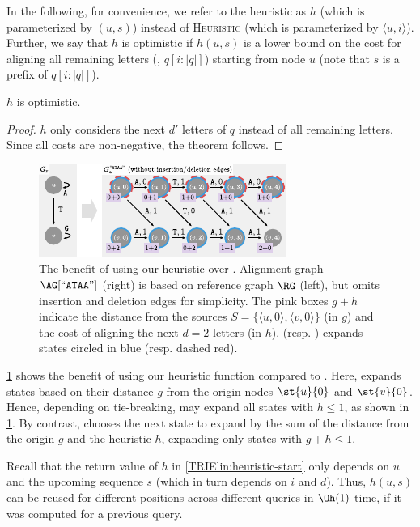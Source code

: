 In the following, for convenience, we refer to the heuristic as $h$ (which is
parameterized by $(u,s)$) instead of \textsc{Heuristic} (which is parameterized
by $\langle u, i \rangle$). Further, we say that $h$ is optimistic if $h(u,s)$
is a lower bound on the cost for aligning all remaining letters (\ie,
$q[i:|q|]$) starting from node $u$ (note that $s$ is a prefix of $q[i:|q|]$).

\begin{samepage}
\begin{thm} \label{TRIEthm:optimistic}
	$h$ is optimistic.
\end{thm}
\begin{proof}
$h$ only considers the next $d'$ letters of $q$ instead of all
remaining letters. Since all costs are non-negative, the theorem follows.
\end{proof}
\end{samepage}

\begin{figure}[t]
	\centering
	\includegraphics[width=0.9\columnwidth]{figs/heuristic}
	\caption{The benefit of using our heuristic over \dijkstra. Alignment graph
	$\AG[``\texttt{ATAA}"]$ (right) is based on reference graph $\RG$ (left),
	but omits insertion and deletion edges for simplicity. The pink boxes $g+h$
	indicate the distance from the sources $S=\{\langle u,0 \rangle, \langle v,0
	\rangle \}$ (in $g$) and the cost of aligning the next $d=2$ letters (in
	$h$). \dijkstra (resp. \A) expands states circled in
	\textcolor{my-full-blue}{blue} (resp.
	\textcolor{my-full-red}{dashed red}).}
	\label{TRIEfig:heuristic-benefit}
\end{figure}

 \label{TRIEpara:heuristic-benefits}
\cref{TRIEfig:heuristic-benefit} shows the benefit of using our heuristic function
compared to \dijkstra. Here, \dijkstra expands states based on their distance
$g$ from the origin nodes $\st{u}{0}$ and $\st{v}{0}$. Hence, depending on
tie-breaking, \dijkstra may expand all states with $h \leq 1$, as shown in
\cref{TRIEfig:heuristic-benefit}. By contrast, \A chooses the next state to expand
by the sum of the distance from the origin $g$ and the heuristic $h$, expanding
only states with $g+h \leq 1$.

 \label{TRIEpara:memoization}
Recall that the return value of $h$ in \cref{TRIElin:heuristic-start} only depends
on $u$ and the upcoming sequence $s$ (which in turn depends on $i$ and $d$).
Thus, $h(u,s)$ can be reused for different positions across different queries in
$\Oh(1)$ time, if it was computed for a previous query.